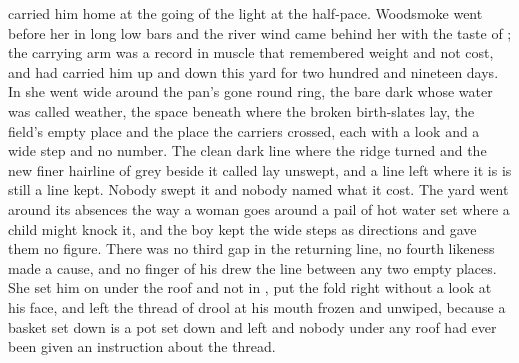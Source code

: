  carried him home at the going of the light at the half-pace. Woodsmoke went before her in long low bars and the river wind came behind her with the taste of ; the carrying arm was a record in muscle that remembered weight and not cost, and had carried him up and down this yard for two hundred and nineteen days. In  she went wide around the pan's gone round ring, the bare dark  whose water was called weather, the space beneath  where the broken birth-slates lay, the field's empty place and the place the carriers crossed, each with a look and a wide step and no number. The clean dark line where the  ridge turned and the new finer hairline of grey beside it called  lay unswept, and a line left where it is is still a line kept. Nobody swept it and nobody named what it cost. The yard went around its absences the way a woman goes around a pail of hot water set where a child might knock it, and the boy kept the wide steps as directions and gave them no figure. There was no third gap in the returning line, no fourth likeness made a cause, and no finger of his drew the line between any two empty places. She set him on  under the roof and not in , put the fold right without a look at his face, and left the thread of drool at his mouth frozen and unwiped, because a basket set down is a pot set down and left and nobody under any roof had ever been given an instruction about the thread.

